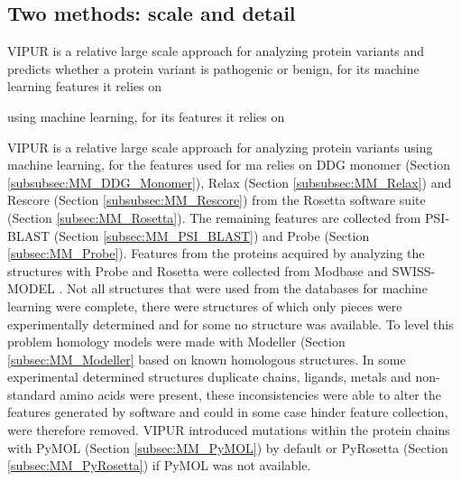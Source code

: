 \subsection{Two methods: scale and detail}

VIPUR is a relative large scale approach for analyzing protein variants and predicts whether a protein variant is pathogenic or benign, for its machine learning features it relies on

 using machine learning, for its features it relies on 

VIPUR is a relative large scale approach for analyzing protein variants using machine learning, for the features used for ma relies on DDG monomer (Section \ref{subsubsec:MM_DDG_Monomer}), Relax (Section \ref{subsubsec:MM_Relax}) and Rescore (Section \ref{subsubsec:MM_Rescore}) from the Rosetta software suite (Section \ref{subsec:MM_Rosetta}). The remaining features are collected from PSI-BLAST (Section \ref{subsec:MM_PSI_BLAST}) and Probe (Section \ref{subsec:MM_Probe}). 
Features from the proteins acquired by analyzing the structures with Probe and Rosetta were collected from Modbase \cite{} and
SWISS-MODEL \cite{}.
Not all structures that were used from the databases for machine learning were complete, there were structures of which only pieces were experimentally determined and for some no structure was available. To level this problem homology models were made with Modeller (Section \ref{subsec:MM_Modeller} based on known homologous structures. In some experimental determined structures duplicate chains, ligands, metals and non-standard amino acids were present, these inconsistencies were able to alter the features generated by software and could in some case hinder feature collection, were therefore removed. VIPUR introduced mutations within the protein chains with PyMOL (Section \ref{subsec:MM_PyMOL}) by default or PyRosetta (Section \ref{subsec:MM_PyRosetta}) if PyMOL was not available.

